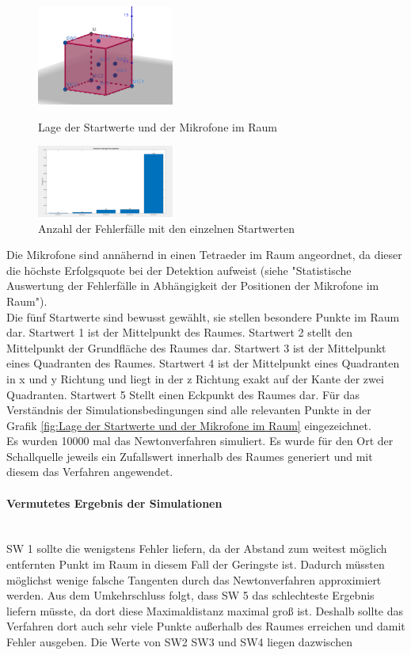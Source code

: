 \begin{figure}
\centering 
\includegraphics[width=0.4\textwidth]{Lage_MIC_Start_AW1}
\caption{Lage der Startwerte und der Mikrofone im Raum}\label{fig:Lage der Startwerte und der Mikrofone im Raum}
\includegraphics[width=0.4\textwidth]{StartwertZusammenfassung}
\caption{Anzahl der Fehlerfälle mit den einzelnen Startwerten}\label{fig:Anzahl der Fehlerfälle mit den einzelnen Startwerten}
\end{figure}
Die Mikrofone sind annähernd in einen Tetraeder im Raum angeordnet, da dieser die höchste Erfolgsquote bei der Detektion aufweist (siehe "Statistische Auswertung der Fehlerfälle in Abhängigkeit der Positionen der Mikrofone im Raum"). \\
Die fünf Startwerte sind bewusst gewählt, sie stellen besondere Punkte im Raum dar. Startwert 1 ist der Mittelpunkt des Raumes. Startwert 2 stellt den Mittelpunkt der Grundfläche des Raumes dar. Startwert 3 ist der Mittelpunkt eines Quadranten des Raumes. Startwert 4 ist der Mittelpunkt eines Quadranten in x und y Richtung und liegt in der z Richtung exakt auf der Kante der zwei Quadranten. Startwert 5 Stellt einen Eckpunkt des Raumes dar. 
Für das Verständnis der Simulationsbedingungen sind alle relevanten Punkte in der Grafik \ref{fig:Lage der Startwerte und der Mikrofone im Raum} eingezeichnet. \\

Es wurden 10000 mal das Newtonverfahren simuliert. Es wurde für den Ort der Schallquelle jeweils ein Zufallswert innerhalb des Raumes generiert und mit diesem das Verfahren angewendet.
\paragraph{Vermutetes Ergebnis der Simulationen}\ \\
SW 1 sollte die wenigstens Fehler liefern, da der Abstand zum weitest möglich entfernten Punkt im Raum in diesem Fall der Geringste ist. Dadurch müssten möglichst wenige falsche Tangenten durch das Newtonverfahren approximiert werden. Aus dem Umkehrschluss folgt, dass SW 5 das schlechteste Ergebnis liefern müsste, da dort diese Maximaldistanz maximal groß ist. Deshalb sollte das Verfahren dort auch sehr viele Punkte außerhalb des Raumes erreichen und damit Fehler ausgeben.
Die Werte von SW2 SW3 und SW4 liegen dazwischen
